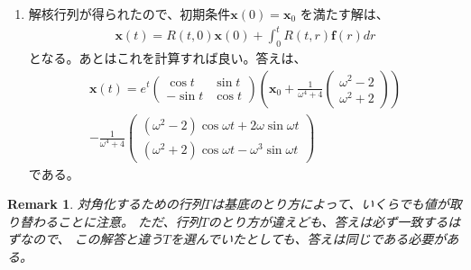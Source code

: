 \documentclass{jsarticle}
\newtheorem{remark}{Remark}
\begin{document}
\begin{enumerate}
\item 解核行列が得られたので、初期条件$\boldsymbol{x}(0)=\boldsymbol{x}_{0}$
を満たす解は、
\begin{align}
\boldsymbol{x}(t)=R(t,0)\boldsymbol{x}(0)
+\int_{0}^{t}R(t,r)\boldsymbol{f}(r)dr
\end{align}
となる。あとはこれを計算すれば良い。答えは、
\begin{align}
\boldsymbol{x}(t)=e^{t}\left(
\begin{array}{cc}
\cos t & \sin t\\
-\sin t & \cos t
\end{array}\right)
\left(\boldsymbol{x}_{0}
+\frac{1}{\omega^{4}+4}
\left(\begin{array}{c}
\omega^{2}-2\\
\omega^{2}+2
\end{array}\right)
\right)\\
-\frac{1}{\omega^{4}+4}\left(
\begin{array}{c}
(\omega^{2}-2)\cos\omega t+2\omega\sin\omega t\\
(\omega^{2}+2)\cos\omega t-\omega^{3}\sin\omega t
\end{array}\right)
\end{align}
である。
\end{enumerate}
\begin{remark}
対角化するための行列$T$は基底のとり方によって、いくらでも値が取り替わることに注意。
ただ、行列$T$のとり方が違えども、答えは必ず一致するはずなので、
この解答と違う$T$を選んでいたとしても、答えは同じである必要がある。
\end{remark}
\end{document}
